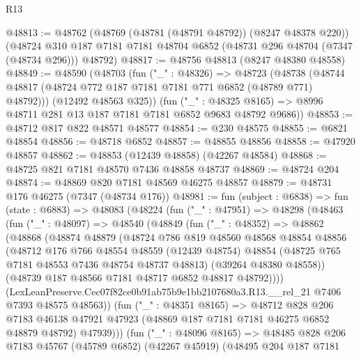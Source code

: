 \begin{lexlean}{R13}
\begin{coremodule}
@48813 := @48762
    (@48769 (@48781 (@48791 @48792)) (@8247 @48378 @220))
    (@48724 @310 @187 @7181 @7181 @48704 @6852 (@48731 @296 @48704 (@7347 (@48734 @296))) @48792)
@48817 := @48756 @48813 (@8247 @48380 @48558)
@48849 := @48590
    (@48703
      (fun ("_" : @48326) =>
      @48723
        (@48738 (@48744 @48817 (@48724 @772 @187 @7181 @7181 @771 @6852 (@48789 @771) @48792)))
        (@12492 @48563 @325))
      (fun ("_" : @48325 @8165) => @8996 @48711 @281 @13 @187 @7181 @7181 @6852 @9683 @48792 @9686))
@48853 := @48712 @817 @822 @48571 @48577
@48854 := @230 @48575
@48855 := @6821 @48854
@48856 := @48718 @6852
@48857 := @48855 @48856
@48858 := @47920 @48857
@48862 := @48853 (@12439 @48858) (@42267 @48584)
@48868 := @48725 @821 @7181 @48570 @7436 @48858 @48737
@48869 := @48724 @204
@48874 := @48869 @820 @7181 @48569 @46275 @48857
@48879 := @48731 @176 @46275 (@7347 (@48734 @176))
@48981 := fun (subject : @6838) =>
  fun (state : @6883) =>
  @48083
    (@48224
      (fun ("_" : @47951) =>
      @48298
        (@48463
          (fun ("_" : @48097) =>
          @48540
            (@48849
              (fun ("_" : @48352) =>
              @48862
                (@48868
                  (@48874
                    @48879
                    (@48724
                      @786
                      @819
                      @48560
                      @48568
                      @48854
                      @48856
                      (@48712
                        @176
                        @766
                        @48554
                        @48559
                        (@12439 @48754)
                        @48854
                        (@48725 @765 @7181 @48553 @7436 @48754 @48737 @48813)
                        (@39264 @48380 @48558))
                      (@48739 @187 @48566 @7181 @48717 @6852 @48817 @48792))))
                (LexLeanPreserve.Cec07f82ce0b91ab75b9e1bb2107680a3.R13.__rel_21
                  @7406
                  @7393
                  @48575
                  @48563))
              (fun ("_" : @48351 @8165) =>
              @48712
                @828
                @206
                @7183
                @46138
                @47921
                @47923
                (@48869 @187 @7181 @7181 @46275 @6852 @48879 @48792)
                @47939)))
          (fun ("_" : @48096 @8165) =>
          @48485
            @828
            @206
            @7183
            @45767
            (@45789 @6852)
            (@42267 @45919)
            (@48495
              @204
              @187
              @7181

\end{coremodule}
\end{lexlean}
